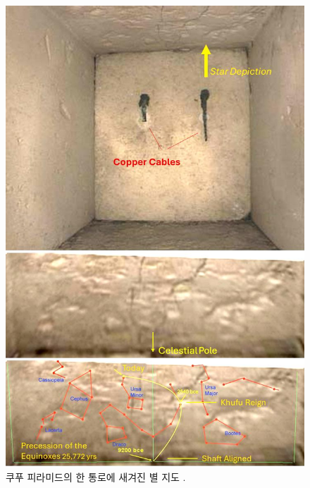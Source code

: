 \documentclass[10pt,twocolumn,letterpaper]{article}
\begin{document}
\begin{figure}[H]
\begin{center}
   \includegraphics[width=1\linewidth]{star-stone.jpg}
\end{center}
   \caption{쿠푸 피라미드의 한 통로에 새겨진 별 지도 \cite{28}.}
\label{fig:18}
\label{fig:onecol}
\end{figure}
\end{document}
